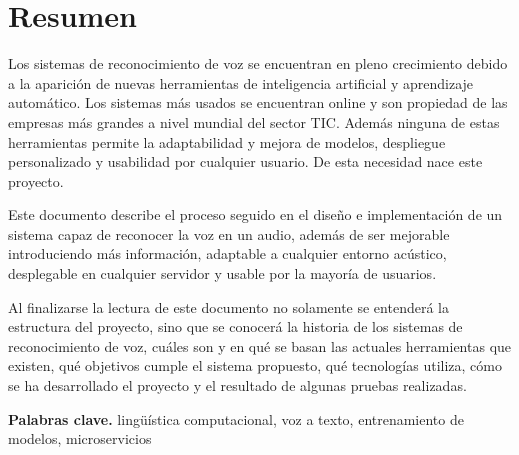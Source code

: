 \documentclass[../main.tex]{subfiles}
\begin{document}
\chapter*{Resumen}\label{ch:es_abstract}
\thispagestyle{empty}
Los sistemas de reconocimiento de voz se encuentran en pleno crecimiento debido a la aparición de nuevas herramientas de inteligencia artificial y aprendizaje automático. Los sistemas más usados se encuentran online y son propiedad de las empresas más grandes a nivel mundial del sector TIC. Además ninguna de estas herramientas permite la adaptabilidad y mejora de modelos, despliegue personalizado y usabilidad por cualquier usuario. De esta necesidad nace este proyecto. 

Este documento describe el proceso seguido en el diseño e implementación de un sistema capaz de reconocer la voz en un audio, además de ser mejorable introduciendo más información, adaptable a cualquier entorno acústico, desplegable en cualquier servidor y usable por la mayoría de usuarios. 

Al finalizarse la lectura de este documento no solamente se entenderá la estructura del proyecto, sino que se conocerá la historia de los sistemas de reconocimiento de voz, cuáles son y en qué se basan las actuales herramientas que existen, qué objetivos cumple el sistema propuesto, qué tecnologías utiliza, cómo se ha desarrollado el proyecto y el resultado de algunas pruebas realizadas.

\smallskip
\noindent \textbf{Palabras clave.} lingüística computacional, voz a texto, entrenamiento de modelos, microservicios
\end{document}

